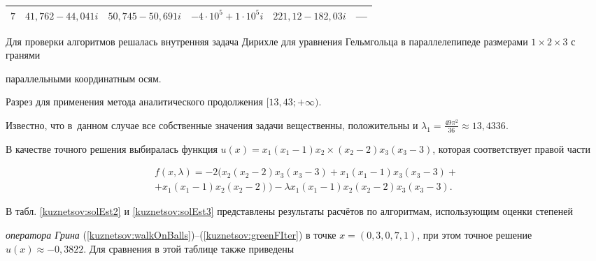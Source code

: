 \begin{table}[b!]
\begin{minipage}[t]{135mm}
\begin{tabular}{c|c|c|c|c|c}
      \hline

      $7$&$41{,}762-44{,}041i$&$50{,}745-50{,}691i$&$-4\cdot10^5+1\cdot10^5i$&$221{,}12-182{,}03i$&---\\

      \hline

    \end{tabular}

    \end{minipage}

\end{table}






Для проверки алгоритмов решалась внутренняя задача Дирихле для уравнения Гельмгольца в параллелепипеде размерами \linebreak $1\times2\times3$ с гранями

параллельными координатным осям.

Разрез для применения метода аналитического продолжения $[13{,}43; +\infty)$.

Известно,  что в~данном случае все собственные значения задачи вещественны,  положительны и $\lambda_1=\frac{49\pi^2}{36}\approx13{,}4336$.



В качестве точного решения выбиралась функция $u(x)=x_1(x_1-1)x_2\times(x_2-2)x_3(x_3-3)$,  которая соответствует правой части

\begin{multline*}

        f(x,  \lambda)=-2(x_2(x_2-2)x_3(x_3-3)+x_1(x_1-1)x_3(x_3-3)+\\

        +x_1(x_1-1)x_2(x_2-2))-\lambda x_1(x_1-1)x_2(x_2-2)x_3(x_3-3).

    \end{multline*}











В табл. \ref{kuznetsov:solEst2} и \ref{kuznetsov:solEst3} представлены результаты расчётов по алгоритмам,  использующим оценки степеней

\emph{оператора Грина} (\ref{kuznetsov:walkOnBalls})--(\ref{kuznetsov:greenFIter}) в точке $x=(0{,}3,  0{,}7,  1)$,  при этом точное решение $u(x)\approx-0{,}3822$. Для сравнения  в этой таблице также приведены


